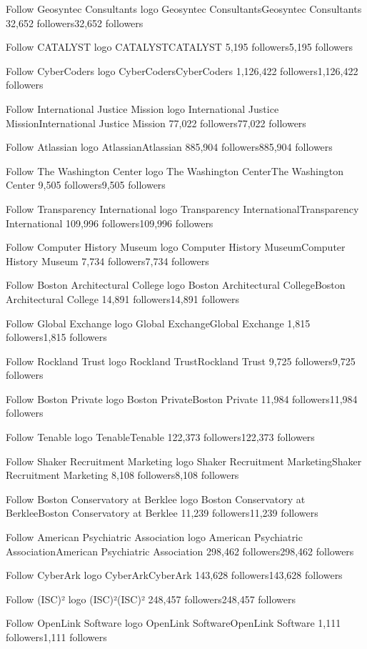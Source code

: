 Follow
Geosyntec Consultants logo
Geosyntec ConsultantsGeosyntec Consultants
32,652 followers32,652 followers

Follow
CATALYST logo
CATALYSTCATALYST
5,195 followers5,195 followers

Follow
CyberCoders logo
CyberCodersCyberCoders
1,126,422 followers1,126,422 followers

Follow
International Justice Mission logo
International Justice MissionInternational Justice Mission
77,022 followers77,022 followers

Follow
Atlassian logo
AtlassianAtlassian
885,904 followers885,904 followers

Follow
The Washington Center logo
The Washington CenterThe Washington Center
9,505 followers9,505 followers

Follow
Transparency International logo
Transparency InternationalTransparency International
109,996 followers109,996 followers

Follow
Computer History Museum logo
Computer History MuseumComputer History Museum
7,734 followers7,734 followers

Follow
Boston Architectural College logo
Boston Architectural CollegeBoston Architectural College
14,891 followers14,891 followers

Follow
Global Exchange logo
Global ExchangeGlobal Exchange
1,815 followers1,815 followers

Follow
Rockland Trust logo
Rockland TrustRockland Trust
9,725 followers9,725 followers

Follow
Boston Private logo
Boston PrivateBoston Private
11,984 followers11,984 followers

Follow
Tenable logo
TenableTenable
122,373 followers122,373 followers

Follow
Shaker Recruitment Marketing logo
Shaker Recruitment MarketingShaker Recruitment Marketing
8,108 followers8,108 followers

Follow
Boston Conservatory at Berklee logo
Boston Conservatory at BerkleeBoston Conservatory at Berklee
11,239 followers11,239 followers

Follow
American Psychiatric Association logo
American Psychiatric AssociationAmerican Psychiatric Association
298,462 followers298,462 followers

Follow
CyberArk logo
CyberArkCyberArk
143,628 followers143,628 followers

Follow
(ISC)² logo
(ISC)²(ISC)²
248,457 followers248,457 followers

Follow
OpenLink Software logo
OpenLink SoftwareOpenLink Software
1,111 followers1,111 followers

